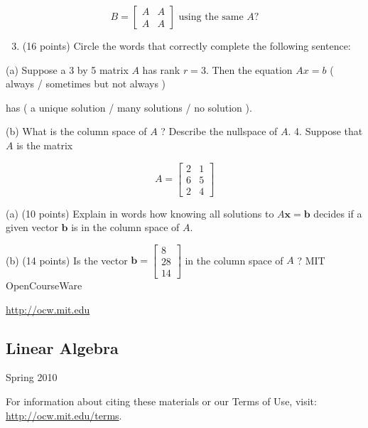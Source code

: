 \documentclass[10pt]{article}
\begin{document}
$$
B=\left[\begin{array}{cc}
A & A \\
A & A
\end{array}\right] \text { using the same } A ?
$$

\begin{enumerate}
  \setcounter{enumi}{2}
  \item (16 points) Circle the words that correctly complete the following sentence:
\end{enumerate}

(a) Suppose a 3 by 5 matrix $A$ has rank $r=3$. Then the equation $A x=b$ ( always / sometimes but not always )

has ( a unique solution / many solutions / no solution ).

(b) What is the column space of $A$ ? Describe the nullspace of $A$. 4. Suppose that $A$ is the matrix

$$
A=\left[\begin{array}{ll}
2 & 1 \\
6 & 5 \\
2 & 4
\end{array}\right]
$$

(a) (10 points) Explain in words how knowing all solutions to $A \mathbf{x}=\mathbf{b}$ decides if a given vector $\mathbf{b}$ is in the column space of $A$.

(b) (14 points) Is the vector $\mathbf{b}=\left[\begin{array}{c}8 \\ 28 \\ 14\end{array}\right]$ in the column space of $A$ ? MIT OpenCourseWare

\href{http://ocw.mit.edu}{http://ocw.mit.edu}

\subsection{Linear Algebra}
Spring 2010

For information about citing these materials or our Terms of Use, visit: \href{http://ocw.mit.edu/terms}{http://ocw.mit.edu/terms}.
\end{document}
